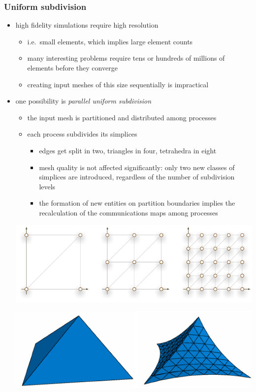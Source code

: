 \begin{frame}[fragile]
%
  \frametitle{Uniform subdivision}
%
  \begin{itemize}
%
  \item high fidelity simulations require high resolution
    \begin{itemize}
    \item i.e.~small elements, which implies large element counts
    \item many interesting problems require tens or hundreds of millions of elements before
      they converge
    \item creating input meshes of this size sequentially is impractical
    \end{itemize}
%
  \item one possibility is {\em parallel uniform subdivision}
    \begin{itemize}
    \item the input mesh is partitioned and distributed among processes
    \item each process subdivides its simplices
      \begin{itemize}
      \item edges get split in two, triangles in four, tetrahedra in eight
      \item mesh quality is not affected significantly: only two new classes of simplices are
        introduced, regardless of the number of subdivision levels
      \item the formation of new entities on partition boundaries implies the recalculation of
        the communications maps among processes
      \end{itemize}
    \end{itemize}
%
  \begin{minipage}{.6\linewidth}
    \includegraphics[scale=0.5]{figures/mesh-subdivision.pdf}
  \end{minipage}
    \hfill
  \begin{minipage}{.35\linewidth}
    \includegraphics[scale=0.5]{figures/mesh-tetsubdivision.pdf}

\end{minipage}
\end{itemize}
\end{frame}
